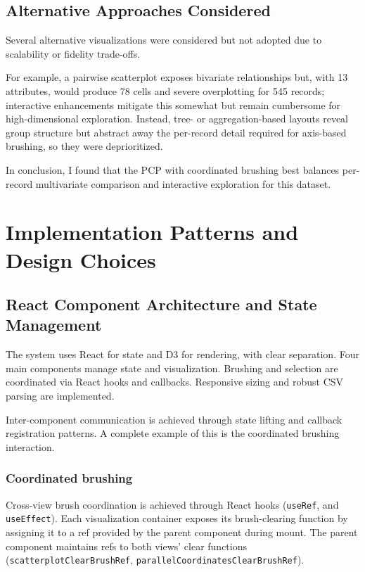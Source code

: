 \documentclass[10pt,a4paper]{article}
\begin{document}
\subsection{Alternative Approaches Considered}
Several alternative visualizations were considered but not adopted due to scalability or fidelity trade-offs.

For example, a pairwise scatterplot exposes bivariate relationships but, with 13 attributes, would produce 78 cells and severe overplotting for 545 records; interactive enhancements mitigate this somewhat but remain cumbersome for high-dimensional exploration. Instead, tree- or aggregation-based layouts reveal group structure but abstract away the per-record detail required for axis-based brushing, so they were deprioritized.

In conclusion, I found that the PCP with coordinated brushing best balances per-record multivariate comparison and interactive exploration for this dataset.



\section{Implementation Patterns and Design Choices}

\subsection{React Component Architecture and State Management}

The system uses React for state and D3 for rendering, with clear separation. Four main components manage state and visualization. Brushing and selection are coordinated via React hooks and callbacks. Responsive sizing and robust CSV parsing are implemented.

Inter-component communication is achieved through state lifting and callback registration patterns. A complete example of this is the coordinated brushing interaction.

\subsubsection{Coordinated brushing}

Cross-view brush coordination is achieved through React hooks (\texttt{useRef}, and \texttt{useEffect}). Each visualization container exposes its brush-clearing function by assigning it to a ref provided by the parent component during mount. The parent component maintains refs to both views' clear functions (\texttt{scatterplotClearBrushRef}, \texttt{parallelCoordinatesClearBrushRef}).
\end{document}
